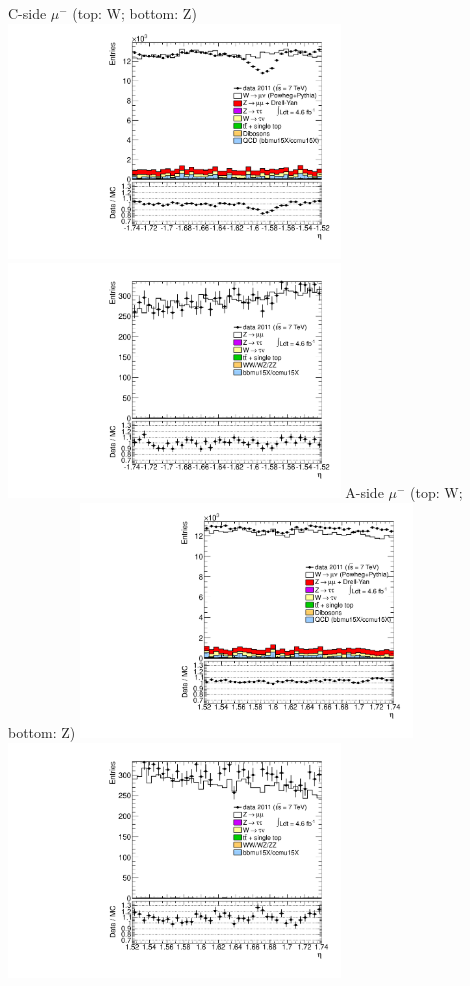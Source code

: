  {
\colb[T]
C-side $\mu^{-}$ (top: W; bottom: Z)
\centering
\includegraphics[width=0.66\textwidth]{dates/20130306/figures/etaphi/W_8_C_stack_l_eta_POS} \\
\includegraphics[width=0.66\textwidth]{dates/20130306/figures/etaphi/Ztinv_8_C_stack_lP_eta_ALL.pdf}
A-side $\mu^{-}$ (top: W; bottom: Z)
\centering
\includegraphics[width=0.66\textwidth]{dates/20130306/figures/etaphi/W_8_A_stack_l_eta_POS} \\
\includegraphics[width=0.66\textwidth]{dates/20130306/figures/etaphi/Ztinv_8_A_stack_lP_eta_ALL.pdf} 
\cole
}

